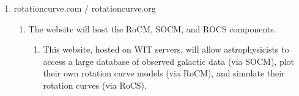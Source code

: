 \documentclass[titlepage]{article}
\begin{document}
\begin{enumerate}
\begin{enumerate}
  \end{enumerate} 
  	\item rotationcurve.com / rotationcurve.org
    	\begin{enumerate}
        	\item The website will host the RoCM, SOCM, and ROCS components.
        	\begin{enumerate}
              \item This website, hosted on WIT servers, will allow astrophysicists to access a large database of observed galactic data (via SOCM), plot their own rotation curve models (via RoCM), and simulate their rotation curves (via RoCS).
        	\end{enumerate}
        \end{enumerate}
    
   
\end{enumerate}
\end{document}
